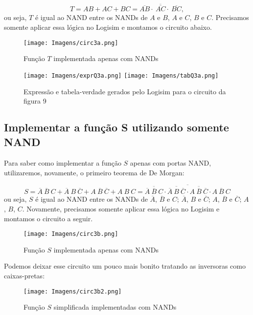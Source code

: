 \documentclass[a4paper, 12pt]{article}
\begin{document}
\[
T = AB + AC + BC = \overline{\overline{AB} \cdot \ \overline{AC} \cdot \ \overline{BC}},
\]
ou seja, $T$ é igual ao NAND entre os NANDs de $A$ e $B$, $A$ e $C$, $B$ e $C$. Precisamos somente aplicar essa lógica no Logisim e montamos o circuito abaixo.

\begin{figure}[H]
    \centering
    \texttt{[image: Imagens/circ3a.png]}
    \caption{Função $T$ implementada apenas com NANDs}
\end{figure}

\begin{figure}[H]
    \centering
    \texttt{[image: Imagens/exprQ3a.png]}
    \texttt{[image: Imagens/tabQ3a.png]} \\
    \caption{Expressão e tabela-verdade gerados pelo Logisim para o circuito da figura 9}
\end{figure}

\subsection{Implementar a função S utilizando somente NAND}
\paragraph{}
Para saber como implementar a função $S$ apenas com portas NAND, utilizaremos, novamente, o primeiro teorema de De Morgan:

\[
S = \overline{A} \ \overline{B} \ C + \overline{A} \ B \ \overline{C} + A \ \overline{B} \ \overline{C} + A \ B \ C = \overline{\overline{\overline{A} \ \overline{B} \ C} \cdot \overline{\overline{A} \ B \ \overline{C}} \cdot \overline{A \ \overline{B} \ \overline{C}} \cdot \overline{A \ B \ C}}
\]
ou seja, $S$ é igual ao NAND entre os NANDs de $\overline{A}$, $\overline{B}$ e $C$; $\overline{A}$, $B$ e $\overline{C}$; $A$, $\overline{B}$ e $\overline{C}$; $A$, $B$, $C$. Novamente, precisamos somente aplicar essa lógica no Logisim e montamos o circuito a seguir.

\begin{figure}[H]
    \centering
    \texttt{[image: Imagens/circ3b.png]}
    \caption{Função $S$ implementada apenas com NANDs}
\end{figure}

Podemos deixar esse circuito um pouco mais bonito tratando as inversoras como caixas-pretas:

\begin{figure}[H]
    \centering
    \texttt{[image: Imagens/circ3b2.png]}
    \caption{Função $S$ simplificada implementadas com NANDs}
\end{figure}
\end{document}
